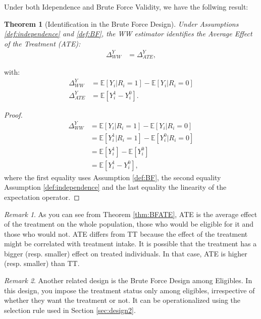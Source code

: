 \documentclass[
]{book}
\newcommand{\esp}[1]{\mathbb{E}[ #1 ]}
\newtheorem{theorem}{Theorem}[chapter]
\theoremstyle{definition}
\theoremstyle{definition}
\theoremstyle{definition}
\theoremstyle{definition}
\theoremstyle{remark}
\newtheorem*{remark}{Remark}
\begin{document}
Under both Idependence and Brute Force Validity, we have the follwing result:

\begin{theorem}[Identification in the Brute Force Design]
\protect\hypertarget{thm:BFATE}{}{\label{thm:BFATE} \iffalse (Identification in the Brute Force Design) \fi{} }Under Assumptions \ref{def:independence} and \ref{def:BF}, the WW estimator identifies the Average Effect of the Treatment (ATE):
\begin{align*}
  \Delta^Y_{WW} & = \Delta^Y_{ATE},
\end{align*}
\end{theorem}

with:
\begin{align*}
  \Delta^Y_{WW} & = \esp{Y_i|R_i=1} - \esp{Y_i|R_i=0} \\
  \Delta^Y_{ATE} & = \esp{Y_i^1-Y_i^0}. 
\end{align*}

\begin{proof}
\iffalse{} {Proof. } \fi{}\begin{align*}
  \Delta^Y_{WW} & = \esp{Y_i|R_i=1} - \esp{Y_i|R_i=0} \\
                & = \esp{Y^1_i|R_i=1} - \esp{Y^0_i|R_i=0} \\
                & = \esp{Y_i^1}-\esp{Y_i^0}\\
                & = \esp{Y_i^1-Y_i^0},
\end{align*}
where the first equality uses Assumption \ref{def:BF}, the second equality Assumption \ref{def:independence} and the last equality the linearity of the expectation operator.
\end{proof}

\begin{remark}
\iffalse{} {Remark. } \fi{}As you can see from Theorem \ref{thm:BFATE}, ATE is the average effect of the treatment on the whole population, those who would be eligible for it and those who would not.
ATE differs from TT because the effect of the treatment might be correlated with treatment intake.
It is possible that the treatment has a bigger (resp. smaller) effect on treated individuals.
In that case, ATE is higher (resp. smaller) than TT.
\end{remark}

\begin{remark}
\iffalse{} {Remark. } \fi{}Another related design is the Brute Force Design among Eligibles.
In this design, you impose the treatment status only among eligibles, irrespective of whether they want the treatment or not.
It can be operationalized using the selection rule used in Section \ref{sec:design2}.
\end{remark}
\end{document}
